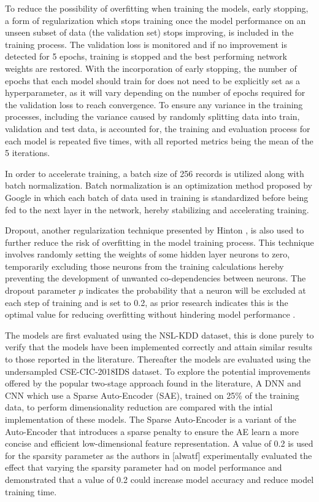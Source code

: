 \documentclass[conference]{IEEEtran}
\begin{document}
To reduce the possibility of overfitting when training the models, early stopping, a form of regularization which stops training once the model performance on an unseen subset of data (the validation set) stops improving, is included in the training process.  The validation loss is monitored and if no improvement is detected for 5 epochs, training is stopped and the best performing network weights are restored. With the incorporation of early stopping, the number of epochs that each model should train for does not need to be explicitly set as a hyperparameter, as it will vary depending on the number of epochs required for the validation loss to reach convergence. To ensure any variance in the training processes, including the variance caused by randomly splitting data into train, validation and test data, is accounted for, the training and evaluation process for each model is repeated five times, with all reported metrics being the mean of the 5 iterations. 

In order to accelerate training, a batch size of 256 records is utilized along with batch normalization. Batch normalization is an optimization method proposed by Google in which each batch of data used in training is standardized before being fed to the next layer in the network, hereby stabilizing and accelerating training. 

Dropout, another regularization technique presented by Hinton \cite{b23}, is also used to further reduce the risk of overfitting in the model training process. This technique involves randomly setting the weights of some hidden layer neurons to zero, temporarily excluding those neurons from the training calculations hereby preventing the development of unwanted co-dependencies between neurons. The dropout parameter $p$ indicates the probability that a neuron will be excluded at each step of training and is set to 0.2, as prior research indicates this is the optimal value for reducing overfitting without hindering model performance \cite{b14}.

The models are first evaluated using the NSL-KDD dataset, this is done purely to verify that the models have been implemented correctly and attain similar results to those reported in the literature. Thereafter the models are evaluated using the undersampled CSE-CIC-2018IDS dataset. To explore the potential improvements offered by the popular two-stage approach found in the literature, A DNN and CNN which use a Sparse Auto-Encoder (SAE), trained on 25\% of the training data, to perform dimensionality reduction are compared with the intial implementation of these models. The Sparse Auto-Encoder is a variant of the Auto-Encoder that introduces a sparse penalty to ensure the AE learn a more concise and efficient low-dimensional feature representation. A value of 0.2 is used for the sparsity parameter as the authors in [alwatf] experimentally evaluated the effect that varying the sparsity parameter had on model performance and demonstrated that a value of 0.2 could increase model accuracy and reduce model training time.  
\end{document}

